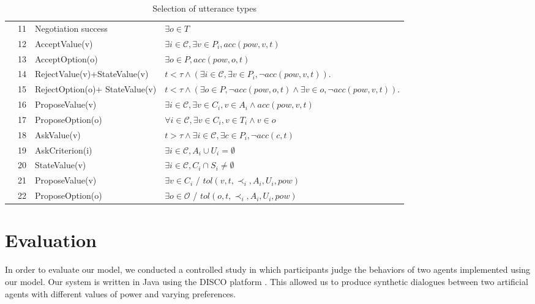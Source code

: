 \documentclass{llncs}
\begin{document}
\begin{table}[!t]
{\begin{tabular}{|p{.3cm}|p{.6cm}|p{3cm}|p{7.5cm}|}
				\hline
				
				\parbox[t]{2mm}{
					} & 11& Negotiation success &  $\exists o \in T$ \\
				&12& AcceptValue(v) & $\exists i\in\mathcal{C}, \exists v \in P_i, acc(pow, v, t)$ \\
				&13&AcceptOption(o) & $\exists o \in P, acc(pow, o, t)$ \\
				&14&RejectValue(v)+\newline StateValue(v) & $ t<\tau \land (\exists i\in\mathcal{C}, \exists v \in P_i, \neg acc(pow,v, t))$.\\
				&15&RejectOption(o)+ \newline StateValue(v) & $ t<\tau \land (\exists o \in P,  \neg acc(pow,o, t) \land \exists v \in o, \neg acc(pow,v, t))$.\\
				&16&ProposeValue(v) &  $\exists i\in\mathcal{C}, \exists v \in C_i, v \in A_i  \land acc(pow, v, t) $\\
				&17&ProposeOption(o)  & $\forall i\in\mathcal{C},\exists v \in C_i, v \in T_i  \land v \in o$ \\
				&18&AskValue(v) & $t > \tau \land \exists i\in\mathcal{C}, \exists c \in P_i, \neg acc(c, t)$ \\
				&19&AskCriterion(i) & $\exists i\in\mathcal{C}, A_i \cup U_i= \emptyset $\\
				&20&StateValue(v) & $\exists i\in\mathcal{C}, C_i\cap S_i \neq \emptyset$	\\
				&21& ProposeValue(v) & $\exists v \in C_i$ / $tol(v, t, \prec_i, A_i, U_i, pow)$\\
				&22& ProposeOption(o) & $\exists o \in \mathcal{O}$ / $tol(o, t, \prec_i, A_i, U_i, pow)$\\
				
				\hline
			\end{tabular}
		}
		\caption{Selection of utterance types}
		\label{table:uttChoice}
	\end{table}
	
	\section{Evaluation}
	\label{sec:evaluation}
	\vspace{-0.5em} 
	In order to evaluate our model, we conducted a controlled study in which participants judge the behaviors of two agents implemented using our model. Our system is written in Java using the DISCO platform \cite{rich09}. This allowed us to produce synthetic dialogues between two artificial agents with different values of power and varying preferences.
	
\end{document}
